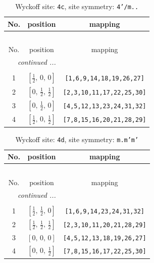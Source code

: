 \documentclass[fleqn,8pt]{jsarticle}
\begin{document}
\renewcommand{\arraystretch}{1.2}
\begin{longtable}{ccc}
\caption{Wyckoff site: {\tt 4c}, site symmetry: {\tt 4'/m..}}
 \\
 \hline \hline
No. & position & mapping \\ \hline \endfirsthead

\multicolumn{2}{l}{\tablename\ \thetable{}} \\
 \hline \hline
No. & position & mapping \\ \hline \endhead

 \hline \hline
\multicolumn{2}{r}{\footnotesize\it continued ...} \\ \endfoot

 \hline \hline
\multicolumn{2}{r}{} \\ \endlastfoot

1 & $\left[ \frac{1}{2},\, 0,\, 0 \right]$ & {\tt [1,6,9,14,18,19,26,27]} \\ \hline
2 & $\left[ 0,\, \frac{1}{2},\, \frac{1}{2} \right]$ & {\tt [2,3,10,11,17,22,25,30]} \\ \hline
3 & $\left[ 0,\, \frac{1}{2},\, 0 \right]$ & {\tt [4,5,12,13,23,24,31,32]} \\ \hline
4 & $\left[ \frac{1}{2},\, 0,\, \frac{1}{2} \right]$ & {\tt [7,8,15,16,20,21,28,29]} \\
\end{longtable}
\renewcommand{\arraystretch}{1.2}
\begin{longtable}{ccc}
\caption{Wyckoff site: {\tt 4d}, site symmetry: {\tt m.m'm'}}
 \\
 \hline \hline
No. & position & mapping \\ \hline \endfirsthead

\multicolumn{2}{l}{\tablename\ \thetable{}} \\
 \hline \hline
No. & position & mapping \\ \hline \endhead

 \hline \hline
\multicolumn{2}{r}{\footnotesize\it continued ...} \\ \endfoot

 \hline \hline
\multicolumn{2}{r}{} \\ \endlastfoot

1 & $\left[ \frac{1}{2},\, \frac{1}{2},\, 0 \right]$ & {\tt [1,6,9,14,23,24,31,32]} \\ \hline
2 & $\left[ \frac{1}{2},\, \frac{1}{2},\, \frac{1}{2} \right]$ & {\tt [2,3,10,11,20,21,28,29]} \\ \hline
3 & $\left[ 0,\, 0,\, 0 \right]$ & {\tt [4,5,12,13,18,19,26,27]} \\ \hline
4 & $\left[ 0,\, 0,\, \frac{1}{2} \right]$ & {\tt [7,8,15,16,17,22,25,30]} \\
\end{longtable}
\end{document}
